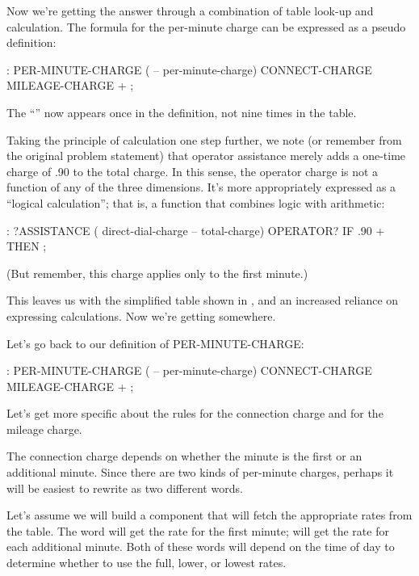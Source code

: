 
Now we're getting the answer through a combination of table look-up
and calculation. The formula for the per-minute charge can be
expressed as a pseudo\Forth{} definition:

\begin{Code}
: PER-MINUTE-CHARGE ( -- per-minute-charge)
        CONNECT-CHARGE  MILEAGE-CHARGE  + ;
\end{Code}
The ``\forth{+}'' now appears once in the definition,
not nine times in the table.

Taking the principle of calculation one step further, we note (or
remember from the original problem statement) that operator assistance
merely adds a one-time charge of .90 to the total charge. In this
sense, the operator charge is not a function of any of the three
dimensions. It's more
appropriately expressed as a ``logical calculation''; that is, a
function that combines logic with arithmetic:

\begin{Code}
: ?ASSISTANCE
   ( direct-dial-charge -- total-charge)
   OPERATOR? IF .90 + THEN ;
\end{Code}
(But remember, this charge applies only to the first minute.)


This leaves us with the simplified table shown in , and an
increased reliance on expressing calculations. Now we're getting
somewhere.

Let's go back to our definition of PER-MINUTE-CHARGE:
\begin{Code}
: PER-MINUTE-CHARGE ( -- per-minute-charge)
   CONNECT-CHARGE  MILEAGE-CHARGE  + ;
\end{Code}
Let's get more specific about the rules for the connection charge and for
the mileage charge.

The connection charge depends on whether the minute is the first or
an additional minute. Since there are two kinds of per-minute charges,
perhaps it will be easiest to rewrite  as two
different words.

Let's assume we will build a component that will fetch the appropriate
rates from the table. The word  will get the rate for
the first minute;  will get the rate for each
additional minute.  Both of these words will depend on the time of day
to determine whether to use the full, lower, or lowest rates.

